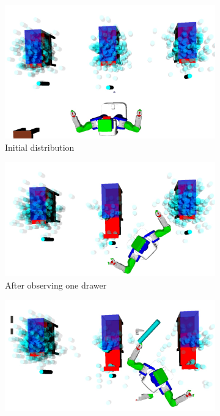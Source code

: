 \begin{figure}
  \centering
  \begin{subfigure}[b]{0.3\linewidth}
    \includegraphics[width=\textwidth]{drawer_images/drawer_dist_0.png}
    \caption{Initial distribution}
    \label{fig:step1}
  \end{subfigure}
  \begin{subfigure}[b]{0.3\linewidth}
    \includegraphics[width=\textwidth]{drawer_images/drawer_dist_1.png}
    \caption{After observing one drawer}
    \label{fig:step2}
  \end{subfigure}
  \begin{subfigure}[b]{0.3\linewidth}
    \includegraphics[width=\textwidth]{drawer_images/drawer_dist_2.png}

\end{subfigure}
\end{figure}
